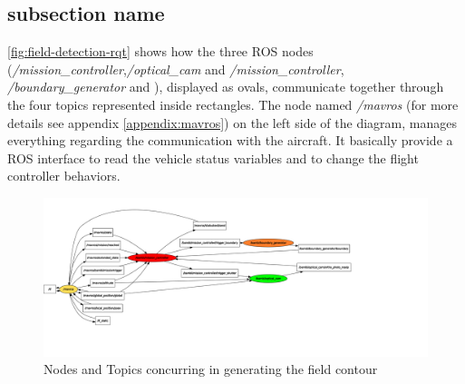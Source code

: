 \subsection{subsection name} %
\label{sub:subsubsection_name}
\autoref{fig:field-detection-rqt} shows how the three ROS nodes (\textit{/mission\_controller},\textit{/optical\_cam} and \textit{/mission\_controller}, \textit{/boundary\_generator} and ), displayed as ovals, communicate together through the four topics represented inside rectangles. The node named \textit{/mavros} (for more details see appendix \ref{appendix:mavros}) on the left side of the diagram, manages everything regarding the communication with the aircraft. It basically provide a ROS interface to read the vehicle status variables and to change the flight controller behaviors.
\begin{figure}[ht]
    \centering
    \includegraphics[width=1.3\textwidth]{figures/C2/fieldDetection-rqt_graph.pdf}
    \caption{Nodes and Topics concurring in generating the field contour}
    \label{fig:field-detection-rqt}
\end{figure}


